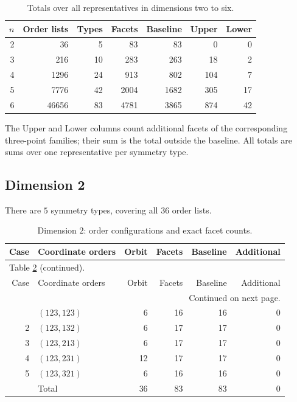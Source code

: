 \documentclass[a4paper,11pt]{amsart}
\numberwithin{equation}{section}
\theoremstyle{definition}
\theoremstyle{remark}
\begin{document}
\begin{table}[htbp]
\centering\small
\caption{Totals over all representatives in dimensions two to six.}
\label{tab:all-dimension-totals}
\begin{tabular}{rrrrrrr}
\toprule
$n$ & Order lists & Types & Facets & Baseline & Upper & Lower\\
\midrule
2 & 36 & 5 & 83 & 83 & 0 & 0\\
3 & 216 & 10 & 283 & 263 & 18 & 2\\
4 & 1296 & 24 & 913 & 802 & 104 & 7\\
5 & 7776 & 42 & 2004 & 1682 & 305 & 17\\
6 & 46656 & 83 & 4781 & 3865 & 874 & 42\\
\bottomrule
\end{tabular}
\end{table}
The Upper and Lower columns count additional facets of the corresponding
three-point families; their sum is the total outside the baseline.
All totals are sums over one representative per symmetry type.

\clearpage
\subsection{Dimension 2}\label{app:tables-n2}
There are $ 5$ symmetry types, covering all $ 36$ order lists.
{\small\setlength{\tabcolsep}{4.5pt}
\begin{longtable}{@{}rlrrrr@{}}
\caption{Dimension $ 2$: order configurations and exact facet counts.}\label{tab:counts-n2}\\
\toprule
Case & Coordinate orders & Orbit & Facets & Baseline & Additional\\
\midrule\endfirsthead
\multicolumn{6}{l}{\small Table \ref{tab:counts-n2} (continued).}\\
\toprule
Case & Coordinate orders & Orbit & Facets & Baseline & Additional\\
\midrule\endhead
\midrule
\multicolumn{6}{r}{\small Continued on next page.}\\
\endfoot\bottomrule\endlastfoot
1 & $(123,123)$ & 6 & 16 & 16 & 0\\
2 & $(123,132)$ & 6 & 17 & 17 & 0\\
3 & $(123,213)$ & 6 & 17 & 17 & 0\\
4 & $(123,231)$ & 12 & 17 & 17 & 0\\
5 & $(123,321)$ & 6 & 16 & 16 & 0\\
\midrule
 & Total & 36 & 83 & 83 & 0\\
\end{longtable}
}
\end{document}
